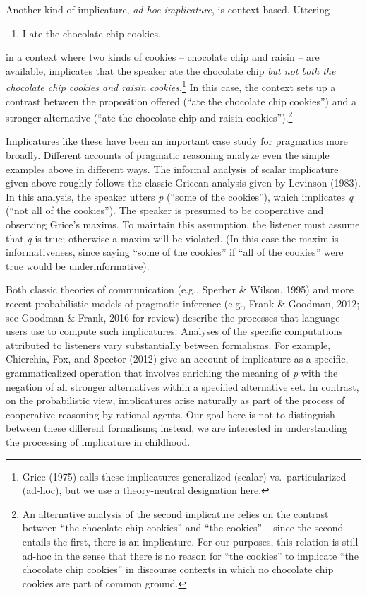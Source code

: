 \documentclass[man]{apa6}
\providecommand{\tightlist}{%
  \setlength{\itemsep}{0pt}\setlength{\parskip}{0pt}}
\theoremstyle{definition}
\theoremstyle{definition}
\theoremstyle{definition}
\theoremstyle{remark}
\begin{document}
Another kind of implicature, \emph{ad-hoc implicature}, is
context-based. Uttering

\begin{enumerate}
\def\labelenumi{(\arabic{enumi})}
\setcounter{enumi}{1}
\tightlist
\item
  I ate the chocolate chip cookies.
\end{enumerate}

\noindent in a context where two kinds of cookies -- chocolate chip and
raisin -- are available, implicates that the speaker ate the chocolate
chip \emph{but not both the chocolate chip cookies and raisin
cookies}.\footnote{Grice (1975) calls these implicatures generalized
  (scalar) vs.~particularized (ad-hoc), but we use a theory-neutral
  designation here.} In this case, the context sets up a contrast
between the proposition offered (\enquote{ate the chocolate chip
cookies}) and a stronger alternative (\enquote{ate the chocolate chip
and raisin cookies}).\footnote{An alternative analysis of the second
  implicature relies on the contrast between \enquote{the chocolate chip
  cookies} and \enquote{the cookies} -- since the second entails the
  first, there is an implicature. For our purposes, this relation is
  still ad-hoc in the sense that there is no reason for \enquote{the
  cookies} to implicate \enquote{the chocolate chip cookies} in
  discourse contexts in which no chocolate chip cookies are part of
  common ground.}

Implicatures like these have been an important case study for pragmatics
more broadly. Different accounts of pragmatic reasoning analyze even the
simple examples above in different ways. The informal analysis of scalar
implicature given above roughly follows the classic Gricean analysis
given by Levinson (1983). In this analysis, the speaker utters \emph{p}
(\enquote{some of the cookies}), which implicates \emph{q} (\enquote{not
all of the cookies}). The speaker is presumed to be cooperative and
observing Grice's maxims. To maintain this assumption, the listener must
assume that \emph{q} is true; otherwise a maxim will be violated. (In
this case the maxim is informativeness, since saying \enquote{some of
the cookies} if \enquote{all of the cookies} were true would be
underinformative).

Both classic theories of communication (e.g., Sperber \& Wilson, 1995)
and more recent probabilistic models of pragmatic inference (e.g., Frank
\& Goodman, 2012; see Goodman \& Frank, 2016 for review) describe the
processes that language users use to compute such implicatures. Analyses
of the specific computations attributed to listeners vary substantially
between formalisms. For example, Chierchia, Fox, and Spector (2012) give
an account of implicature as a specific, grammaticalized operation that
involves enriching the meaning of \emph{p} with the negation of all
stronger alternatives within a specified alternative set. In contrast,
on the probabilistic view, implicatures arise naturally as part of the
process of cooperative reasoning by rational agents. Our goal here is
not to distinguish between these different formalisms; instead, we are
interested in understanding the processing of implicature in childhood.
\end{document}
